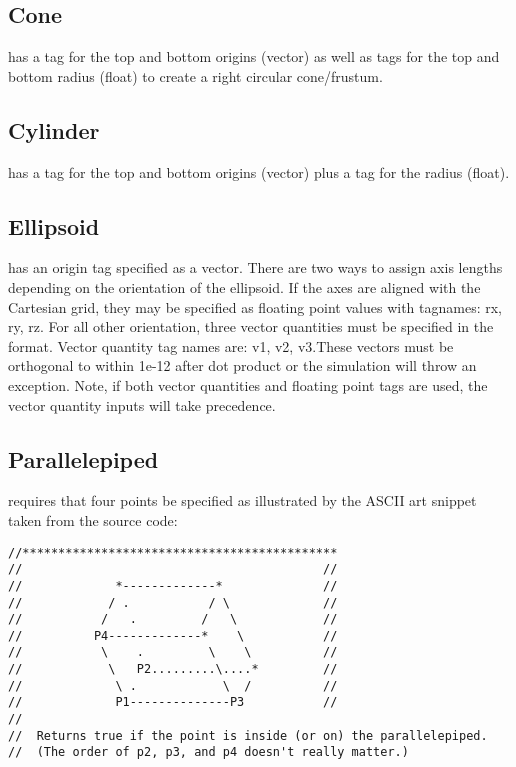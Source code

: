 \subsection{Cone}
 has a tag for the top and bottom origins (vector)
as well as tags for the top and bottom radius (float) to create a
right circular cone/frustum.

\subsection{Cylinder}
 has a tag for the top and bottom origins
(vector) plus a tag for the radius (float).

\subsection{Ellipsoid}
 has an origin tag specified as a vector.  There are 
two ways to assign axis lengths depending on the orientation of the ellipsoid.
If the axes are aligned with the Cartesian grid, they may be specified as 
floating point values with tagnames: rx, ry, rz.  For all other orientation, 
three vector quantities must be specified in the \Textsfc{[a,b,c]} format.
Vector quantity tag names are: v1, v2, v3.These vectors must be orthogonal 
to within 1e-12 after dot product or the simulation will throw an exception.  
Note, if both vector quantities and floating point tags are used, 
the vector quantity inputs will take precedence.  

\subsection{Parallelepiped}
 requires that four points be specified as
illustrated by the ASCII art snippet taken from the source code:

\begin{lstlisting}[backgroundcolor=\color{background}]
//********************************************
//                                          //
//             *-------------*              //
//            / .           / \             //
//           /   .         /   \            //
//          P4-------------*    \           //
//           \    .         \    \          //
//            \   P2.........\....*         //
//             \ .            \  /          //
//             P1--------------P3           //
//
//  Returns true if the point is inside (or on) the parallelepiped.
//  (The order of p2, p3, and p4 doesn't really matter.)
\end{lstlisting}

